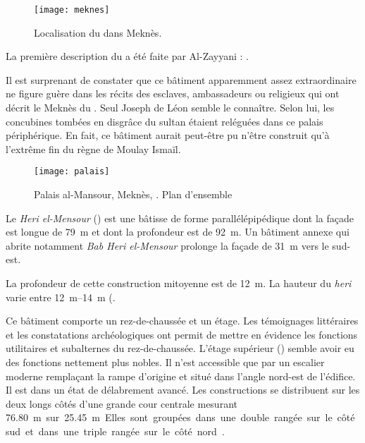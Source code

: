 \begin{figure}[htb]
  \texttt{[image: meknes]}
  \caption{Localisation du \PaM dans Meknès.}
  \label{fig:meknes}
\end{figure}

La première description du \PaM a été faite par Al-Zayyani : 
\autocite{Barrucand_1976}.

Il est surprenant de constater que ce bâtiment apparemment 
assez extraordinaire ne figure guère dans les récits des 
esclaves, ambassadeurs ou religieux qui ont décrit le Meknès du
. Seul Joseph de Léon semble le connaître. Selon lui, 
les concubines tombées en disgrâce du sultan étaient reléguées dans ce 
palais périphérique. En fait, ce bâtiment aurait peut-être pu n'être 
construit qu'à l'extrême fin du règne de Moulay Ismaïl.

\begin{figure}[htb]
  \texttt{[image: palais]}
  \caption{Palais al-Mansour, Meknès, . Plan d'ensemble 
           \autocite{Barrucand_1976}}
  \label{fig:palais}
\end{figure}

Le \emph{Heri el-Mensour} () est une bâtisse de forme 
parallélépipédique dont la façade est longue de \SI{79}{\m} et dont la 
profondeur est de \SI{92}{\m}. Un bâtiment annexe qui abrite notamment 
\emph{Bab Heri el-Mensour} prolonge la façade de \SI{31}{\m} vers le 
sud-est.

La profondeur de cette construction mitoyenne est de \SI{12}{\m}. 
La hauteur du \emph{heri} varie entre 
\SIrange[range-phrase=\ et\ ]{12}{14}{\m} (\autocite{Barrucand_1976}.

Ce bâtiment comporte un rez-de-chaussée et un étage. Les témoignages 
littéraires et les constatations archéologiques ont permit de mettre 
en évidence les fonctions utilitaires et subalternes du 
rez-de-chaussée. L'étage supérieur () semble avoir eu 
des fonctions nettement plus nobles. Il n'est accessible que par un 
escalier moderne remplaçant la rampe d'origine et situé dans l'angle 
nord-est de l'édifice. Il est dans un état de délabrement avancé. Les 
constructions se distribuent sur les deux longs côtés d'une grande 
cour centrale mesurant \SI{76.80}m sur \SI{25.45}{\m} Elles sont 
groupées dans une double rangée sur le côté sud et dans une triple 
rangée sur le côté nord \autocite{Barrucand_1976}.


